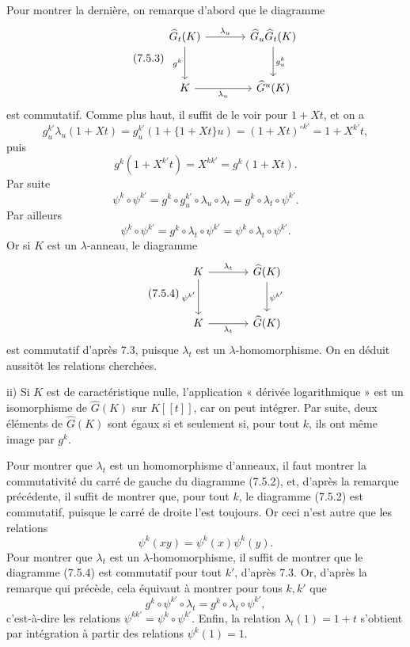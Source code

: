 \documentclass[11pt]{article}
\begin{document}
Pour montrer la dernière, on remarque d'abord que le diagramme
\begin{equation}\tag{7.5.3}
\begin{tikzcd}[column sep=large,row sep=large]
\widehat G_t(K) \arrow[r,"\lambda_u"] \arrow[d,"g^k"'] &
\widehat G_u\widehat G_t(K) \arrow[d,"g^k_u"]\\
K \arrow[r,"\lambda_u"'] &
\widehat G^u(K)
\end{tikzcd}
\end{equation}
est commutatif. Comme plus haut, il suffit de le voir pour \(1+Xt\), et on a
\[
  g^{k'}_u\lambda_u(1+Xt)
  =
  g^{k'}_u(1+\{1+Xt\}u)
  =
  (1+Xt)^{\circ k'}
  =
  1+X^{k'}t,
\]
puis
\[
  g^k(1+X^{k'}t)=X^{kk'}=g^k(1+Xt).
\]
Par suite
\[
  \psi^k\circ\psi^{k'}
  =
  g^k\circ g^{k'}_u\circ\lambda_u\circ\lambda_t
  =
  g^k\circ\lambda_t\circ\psi^{k'}.
\]
Par ailleurs
\[
  \psi^k\circ\psi^{k'}
  =
  g^k\circ\lambda_t\circ\psi^{k'}
  =
  \psi^k\circ\lambda_t\circ\psi^{k'}.
\]
Or si \(K\) est un \(\lambda\)-anneau, le diagramme
\begin{equation}\tag{7.5.4}
\begin{tikzcd}[column sep=large,row sep=large]
K \arrow[r,"\lambda_t"] \arrow[d,"\psi^{k'}"'] &
\widehat G(K) \arrow[d,"\psi^{k'}"]\\
K \arrow[r,"\lambda_t"'] &
\widehat G(K)
\end{tikzcd}
\end{equation}
est commutatif d'après 7.3, puisque \(\lambda_t\) est un \(\lambda\)-homomorphisme. On en déduit aussitôt les relations cherchées.

ii) Si \(K\) est de caractéristique nulle, l'application « dérivée logarithmique » est un isomorphisme de \(\widehat G(K)\) sur \(K[[t]]\), car on peut intégrer. Par suite, deux éléments de \(\widehat G(K)\) sont égaux si et seulement si, pour tout \(k\), ils ont même image par \(g^k\).

Pour montrer que \(\lambda_t\) est un homomorphisme d'anneaux, il faut montrer la commutativité du carré de gauche du diagramme (7.5.2), et, d'après la remarque précédente, il suffit de montrer que, pour tout \(k\), le diagramme (7.5.2) est commutatif, puisque le carré de droite l'est toujours. Or ceci n'est autre que les relations
\[
  \psi^k(xy)=\psi^k(x)\psi^k(y).
\]
Pour montrer que \(\lambda_t\) est un \(\lambda\)-homomorphisme, il suffit de montrer que le diagramme (7.5.4) est commutatif pour tout \(k'\), d'après 7.3. Or, d'après la remarque qui précède, cela équivaut à montrer pour tous \(k,k'\) que
\[
  g^k\circ\psi^{k'}\circ\lambda_t
  =
  g^k\circ\lambda_t\circ\psi^{k'},
\]
c'est-à-dire les relations \(\psi^{kk'}=\psi^k\circ\psi^{k'}\). Enfin, la relation \(\lambda_t(1)=1+t\) s'obtient par intégration à partir des relations \(\psi^k(1)=1\).
\end{document}
